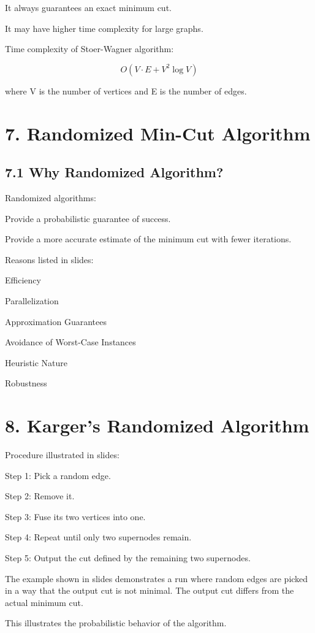 \documentclass[11pt]{article}
\begin{document}
It always guarantees an exact minimum cut.

It may have higher time complexity for large graphs.

Time complexity of Stoer-Wagner algorithm:

\[
O(V \cdot E + V^2 \log V)
\]

where V is the number of vertices and E is the number of edges.

\section*{7. Randomized Min-Cut Algorithm}

\subsection*{7.1 Why Randomized Algorithm?}

Randomized algorithms:

Provide a probabilistic guarantee of success.

Provide a more accurate estimate of the minimum cut with fewer iterations.

Reasons listed in slides:

Efficiency

Parallelization

Approximation Guarantees

Avoidance of Worst-Case Instances

Heuristic Nature

Robustness

\section*{8. Karger’s Randomized Algorithm}

Procedure illustrated in slides:

Step 1: Pick a random edge.

Step 2: Remove it.

Step 3: Fuse its two vertices into one.

Step 4: Repeat until only two supernodes remain.

Step 5: Output the cut defined by the remaining two supernodes.

The example shown in slides demonstrates a run where random edges are picked in a way that the output cut is not minimal. The output cut differs from the actual minimum cut.

This illustrates the probabilistic behavior of the algorithm.
\end{document}
